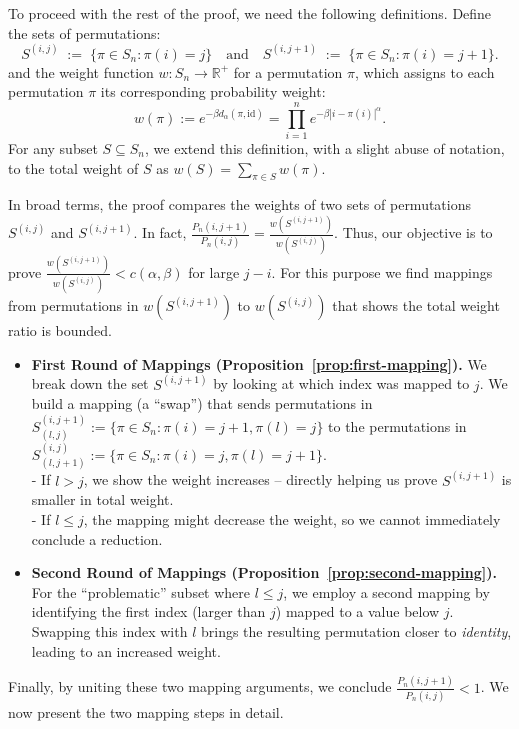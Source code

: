 \documentclass{article}
\begin{document}
\medskip

To proceed with the rest of the proof, we need the following definitions. 
Define the sets of permutations:
\[
S^{(i,j)} \;:=\; \{\pi\in S_n : \pi(i)=j\} 
\quad \text{and} \quad
S^{(i,j+1)} \;:=\; \{\pi \in S_n: \pi(i)=j+1\}.
\]
and the weight function \( w: S_n \to \mathbb{R}^+ \) for a permutation \( \pi \), which assigns to each permutation \( \pi \) its corresponding probability weight:
\begin{equation}
    w(\pi) := e^{-\beta d_\alpha(\pi, \text{id})} = \prod_{i=1}^n e^{-\beta |i - \pi(i)|^\alpha}.
\end{equation}
For any subset \( S \subseteq S_n \), we extend this definition, with a slight abuse of notation, to the total weight of \( S \) as
$w(S) = \sum_{\pi \in S} w(\pi).$


In broad terms, the proof compares the weights of two sets of permutations $S^{(i,j)}$ and $S^{(i,j+1)}$.
In fact, \(\frac{P_n(i,j+1)}{P_n(i,j)}=\frac{w(S^{(i,j+1)})}{w(S^{(i,j)})}\). Thus, our objective is to prove
\(\displaystyle 
\frac{w(S^{(i,j+1)})}{w(S^{(i,j)})} < c(\alpha,\beta)
\)
for large \( j - i \). For this purpose we find mappings from permutations in $w(S^{(i,j+1)})$ to $w(S^{(i,j)})$ that shows the total weight ratio is bounded.


\begin{itemize}
\item \textbf{First Round of Mappings (Proposition~\ref{prop:first-mapping}).}  
We break down the set \(S^{(i,j+1)}\) by looking at which index was mapped to \(j\). We build a mapping (a “swap”) that sends permutations in \(S^{(i,j+1)}_{(l,j)}:= \{\pi\in S_n: \pi(i)=j+1, \pi(l)=j\}\) to the permutations in \(S^{(i,j)}_{(l,j+1)}:=\{\pi\in S_n: \pi(i)=j, \pi(l)=j+1\}\).  \\
  - If \(l > j\), we show the weight increases -- directly helping us prove \(S^{(i,j+1)}\) is smaller in total weight.\\  
  - If \(l \le j\), the mapping might decrease the weight, so we cannot immediately conclude a reduction. 

\item \textbf{Second Round of Mappings (Proposition~\ref{prop:second-mapping}).}  
For the ``problematic'' subset where \(l \le j\), we employ a second mapping by identifying the first index (larger than $j$) mapped to a value {below} $j$.  Swapping this index with $l$ brings the resulting permutation closer to \emph{identity}, leading to an increased weight. 
\end{itemize}
Finally, by uniting these two mapping arguments, we conclude \(\tfrac{P_n(i,j+1)}{P_n(i,j)} < 1\). 
We now present the two mapping steps in detail.
\end{document}
